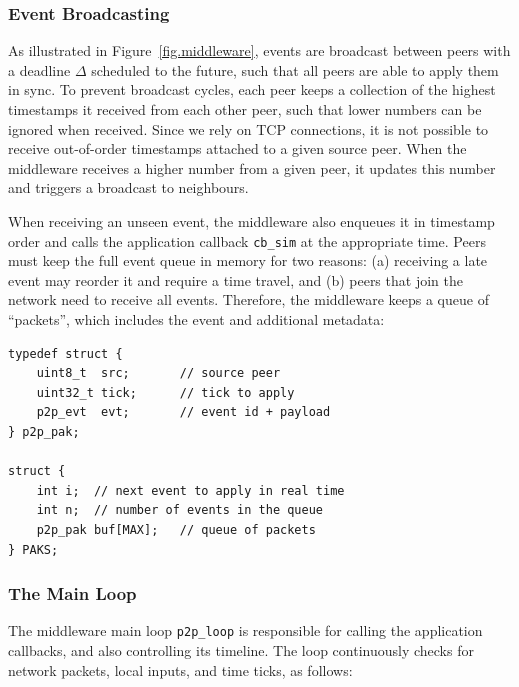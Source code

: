 \documentclass[12pt]{article}
\newcommand{\code}[1]  {\texttt{\small{#1}}}
\begin{document}
\subsubsection{Event Broadcasting}
\label{sec.tml.middleware.events}

As illustrated in Figure~\ref{fig.middleware}, events are broadcast between
peers with a deadline $\Delta$ scheduled to the future, such that all peers are
able to apply them in sync.
%
To prevent broadcast cycles, each peer keeps a collection of the highest
timestamps it received from each other peer, such that lower numbers can be
ignored when received.
Since we rely on TCP connections, it is not possible to receive out-of-order
timestamps attached to a given source peer.
When the middleware receives a higher number from a given peer, it updates this
number and triggers a broadcast to neighbours.
%

When receiving an unseen event, the middleware also enqueues it in timestamp
order and calls the application callback \code{cb\_sim} at the appropriate
time.
Peers must keep the full event queue in memory for two reasons:
    (a) receiving a late event may reorder it and require a time travel, and
    (b) peers that join the network need to receive all events.
%
Therefore, the middleware keeps a queue of ``packets'', which includes the
event and additional metadata:

{\footnotesize
\begin{verbatim}
typedef struct {
    uint8_t  src;       // source peer
    uint32_t tick;      // tick to apply
    p2p_evt  evt;       // event id + payload
} p2p_pak;

struct {
    int i;  // next event to apply in real time
    int n;  // number of events in the queue
    p2p_pak buf[MAX];   // queue of packets
} PAKS;
\end{verbatim}
}

\subsubsection{The Main Loop}
\label{sec.tml.middleware.loop}

The middleware main loop \code{p2p\_loop} is responsible for calling the
application callbacks, and also controlling its timeline.
The loop continuously checks for network packets, local inputs, and time ticks,
as follows:
\end{document}
